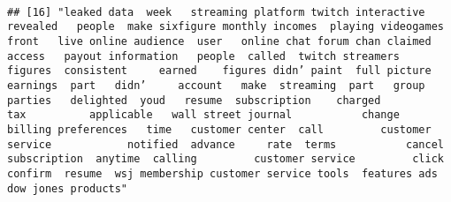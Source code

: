 \documentclass[
]{article}
\begin{document}
\begin{verbatim}
                                                                                                                                                                                                                                                                                                                                                                                                                                                                   
## [16] "leaked data  week   streaming platform twitch interactive revealed   people  make sixfigure monthly incomes  playing videogames  front   live online audience  user   online chat forum chan claimed   access   payout information   people  called  twitch streamers     figures  consistent     earned    figures didn’ paint  full picture   earnings  part   didn’     account   make  streaming  part   group    parties   delighted  youd   resume  subscription    charged           tax          applicable   wall street journal           change  billing preferences   time   customer center  call         customer service            notified  advance     rate  terms           cancel  subscription  anytime  calling         customer service         click confirm  resume  wsj membership customer service tools  features ads  dow jones products"                                                                                                                                                                                                                                                                                                                                                                                                                                                                                                                                                                                                                                                                                                                                                                                                                                                                                                                                                                                                                                                                                                                                                                                                                                                                                                                                                                                                                                                                                                                                                                                                                                                                                                                                                                                                                                                                                                                                                                                                                                                                                                    
\end{verbatim}
\end{document}
